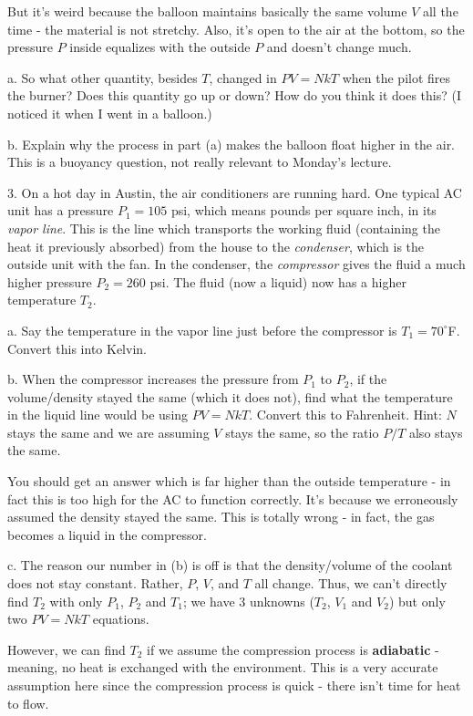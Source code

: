 \documentclass[12pt]{article}
\begin{document}
But it's weird because the balloon maintains basically the same volume $V$ all the time - the material is not stretchy. Also, it's open to the air at the bottom, so the pressure $P$ inside equalizes with the outside $P$ and doesn't change much. 

a. So what other quantity, besides $T$, changed in $PV=NkT$ when the pilot fires the burner? Does this quantity go up or down? How do you think it does this? (I noticed it when I went in a balloon.)

b. Explain why the process in part (a) makes the balloon float higher in the air. This is a buoyancy question, not really relevant to Monday's lecture.

3. On a hot day in Austin, the air conditioners are running hard. One typical AC unit has a pressure $P_1 = 105$ psi, which means pounds per square inch, in its \textit{vapor line}. This is the line which transports the working fluid (containing the heat it previously absorbed) from the house to the \textit{condenser}, which is the outside unit with the fan. In the condenser, the \textit{compressor} gives the fluid a much higher pressure $P_2 = 260$ psi. The fluid (now a liquid) now has a higher temperature $T_2$.

a. Say the temperature in the vapor line just before the compressor is $T_1= 70 ^{\circ}$F. Convert this into Kelvin.

b. When the compressor increases the pressure from $P_1$ to $P_2$, if the volume/density stayed the same (which it does not), find what the temperature in the liquid line would be using $PV=NkT$. Convert this to Fahrenheit. Hint: $N$ stays the same and we are assuming $V$ stays the same, so the ratio $P/T$ also stays the same.


You should get an answer which is far higher than the outside temperature - in fact this is too high for the AC to function correctly. It's because we erroneously assumed the density stayed the same. This is totally wrong - in fact, the gas becomes a liquid in the compressor.

c. The reason our number in (b) is off is that the density/volume of the coolant does not stay constant. Rather, $P$, $V$, and $T$ all change. Thus, we can't directly find $T_2$ with only $P_1$,  $P_2$ and $T_1$; we have 3 unknowns ($T_2$, $V_1$ and $V_2$) but only two $PV=NkT$ equations.

However, we can find $T_2$ if we assume the compression process is \textbf{adiabatic} - meaning, no heat is exchanged with the environment. This is a very accurate assumption here since the compression process is quick - there isn't time for heat to flow. 
\end{document}
